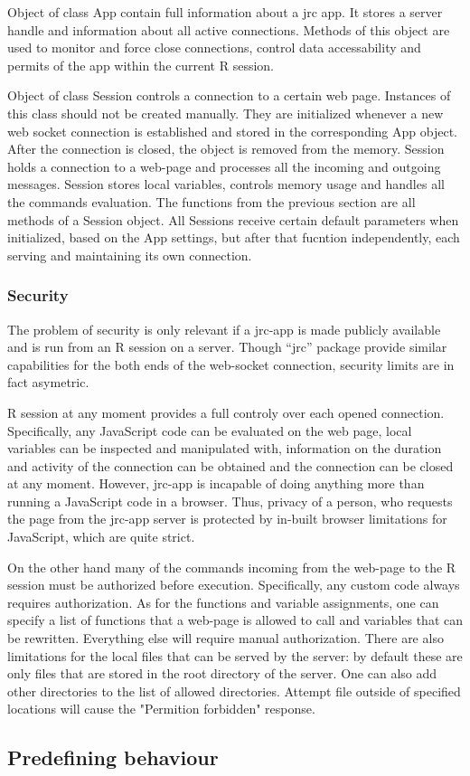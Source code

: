 \documentclass[twocolumn,10pt]{article}
\begin{document}
Object of class App contain full information about a jrc app. It stores a server handle and information about all active connections. Methods of this object are used to monitor and force close connections, control data accessability and permits of the app within the current R session.

Object of class Session controls a connection to a certain web page. Instances of this class should not be created manually. They are initialized whenever a new web socket connection is established and stored in the corresponding App object. After the connection is closed, the object is removed from the memory. Session holds a connection to a web-page and processes all the incoming and outgoing messages. Session stores local variables, controls memory usage and handles all the commands evaluation. The functions from the previous section are all methods of a Session object. All Sessions receive certain default parameters when initialized, based on the App settings, but after that fucntion independently, each serving and maintaining its own connection. 

\subsubsection{Security}

The problem of security is only relevant if a jrc-app is made publicly available and is run from an R session on a server. Though ``jrc'' package provide similar capabilities for the both ends of the web-socket connection, security limits are in fact asymetric.

R session at any moment provides a full controly over each opened connection. Specifically, any JavaScript code can be evaluated on the web page, local variables can be inspected and manipulated with, information on the duration and activity of the connection can be obtained and the connection can be closed at any moment. However, jrc-app is incapable of doing anything more than running a JavaScript code in a browser. Thus, privacy of a person, who requests the page from the jrc-app server is protected by in-built browser limitations for JavaScript, which are quite strict.

On the other hand many of the commands incoming from the web-page to the R session must be authorized before execution. Specifically, any custom code always requires authorization. As for the functions and variable assignments, one can specify a list of functions that a web-page is allowed to call and variables that can be rewritten. Everything else will require manual authorization. There are also limitations for the local files that can be served by the server: by default these are only files that are stored in the root directory of the server. One can also add other directories to the list of allowed directories. Attempt file outside of specified locations will cause the "Permition forbidden" response.

\subsection{Predefining behaviour}


\begin{small} 
\balance
%
\end{small}
\end{document}

